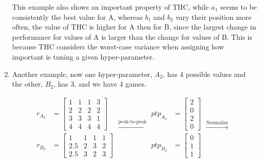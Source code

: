 \documentclass[10pt]{article} %
\begin{document}
\begin{enumerate}
    
    This example also shows an important property of THC, while $a_1$ seems to be consistently the best value for A, whereas $b_1$ and $b_2$ vary their position more often, the value of THC is higher for A then for B, since the largest change in performance for values of A is larger than the change for values of B. This is because THC considers the worst-case variance when assigning how important is tuning a given hyper-parameter.
    
    \item Another example, now one hyper-parameter, $A_2$, has 4 possible values and the other, $B_2$, has 3, and we have 4 games.
    
\begin{equation*}
    \begin{aligned}
        r_{A_2} &= \begin{bmatrix}
                    1 & 1 & 1 & 3\\
                    2 & 2 & 2 & 2\\
                    3 & 3 & 3 & 1 \\
                    4 & 4 & 4 & 4
                    \end{bmatrix} \\
        r_{B_2} &= \begin{bmatrix}
                    1 & 1 & 1 & 1\\
                    2.5 & 2 & 3 & 2\\
                    2.5 & 3 & 2 & 3
                    \end{bmatrix}
    \end{aligned}
\xrightarrow{\text{peak-to-peak}}
\begin{aligned}
        ptp_{A_2} &= \begin{bmatrix}
                    2 \\
                    0 \\
                    2 \\
                    0
                    \end{bmatrix} \\
        ptp_{B_2} &= \begin{bmatrix}
                    0 \\
                    1 \\
                    1
                    \end{bmatrix}
    \end{aligned}
\xrightarrow{\text{Normalize}}
\begin{aligned}

\end{aligned}
\end{equation*}
\end{enumerate}
\end{document}
